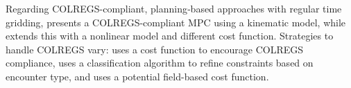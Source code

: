 Regarding \acrshort{COLREGS}-compliant, planning‐based approaches with regular time gridding,
\citet{Hagen2018} presents a COLREGS-compliant MPC using a kinematic model, while \citet{Menges2024} extends this with a nonlinear model and different cost function. Strategies to handle \acrshort{COLREGS} vary: \citet{Hagen2018} uses a cost function to encourage COLREGS compliance, \citet{Thyri2022-MPC} uses a classification algorithm to refine constraints based on encounter type, and \citet{Menges2024} uses a potential field-based cost function.








